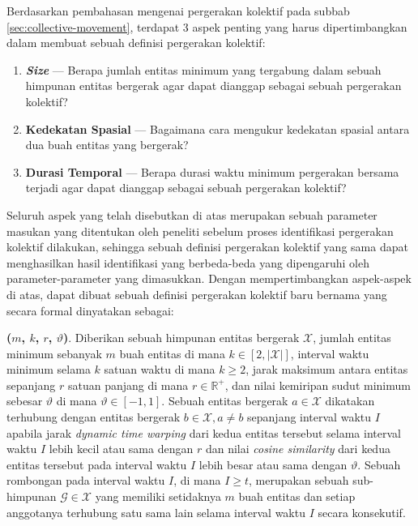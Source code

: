 Berdasarkan pembahasan mengenai pergerakan kolektif pada subbab \ref{sec:collective-movement}, terdapat 3 aspek penting yang harus dipertimbangkan dalam membuat sebuah definisi pergerakan kolektif:

\begin{enumerate}
    \item \textbf{\textit{Size}} --- Berapa jumlah entitas minimum yang tergabung dalam sebuah himpunan entitas bergerak agar dapat dianggap sebagai sebuah pergerakan kolektif?
    \item \textbf{Kedekatan Spasial} --- Bagaimana cara mengukur kedekatan spasial antara dua buah entitas yang bergerak?
    \item \textbf{Durasi Temporal} --- Berapa durasi waktu minimum pergerakan bersama terjadi agar dapat dianggap sebagai sebuah pergerakan kolektif?
\end{enumerate}

Seluruh aspek yang telah disebutkan di atas merupakan sebuah parameter masukan yang ditentukan oleh peneliti sebelum proses identifikasi pergerakan kolektif dilakukan, sehingga sebuah definisi pergerakan kolektif yang sama dapat menghasilkan hasil identifikasi yang berbeda-beda yang dipengaruhi oleh parameter-parameter yang dimasukkan. 
Dengan mempertimbangkan aspek-aspek di atas, dapat dibuat sebuah definisi pergerakan kolektif baru bernama \pergerakankolektif yang secara formal dinyatakan sebagai:

\noindent \textbf{\pergerakankolektif($m$, $k$, $r$, $\vartheta$)}. Diberikan sebuah himpunan entitas bergerak $\mathcal{X}$, jumlah entitas minimum sebanyak $m$ buah entitas di mana $k \in [2, |\mathcal{X}|]$, interval waktu minimum selama $k$ satuan waktu di mana $k \geq 2$, jarak maksimum antara entitas sepanjang $r$ satuan panjang di mana $r \in \mathbb{R}^+$, dan nilai kemiripan sudut minimum sebesar $\vartheta$ di mana $\vartheta \in [-1, 1]$. Sebuah entitas bergerak $a \in \mathcal{X}$ dikatakan terhubung dengan entitas bergerak $b \in \mathcal{X}, a \neq b$ sepanjang interval waktu $I$ apabila jarak \textit{dynamic time warping} dari kedua entitas tersebut selama interval waktu $I$ lebih kecil atau sama dengan $r$ dan nilai \textit{cosine similarity} dari kedua entitas tersebut pada interval waktu $I$ lebih besar atau sama dengan $\vartheta$. Sebuah rombongan pada interval waktu $I$, di mana $I \geq t$, merupakan sebuah sub-himpunan $\mathcal{G} \in \mathcal{X}$ yang memiliki setidaknya $m$ buah entitas dan setiap anggotanya terhubung satu sama lain selama interval waktu $I$ secara konsekutif. 

